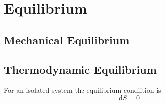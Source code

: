 \documentclass[../thesis.tex]{subfiles}
\begin{document}
    \section{Equilibrium}
    \label{sec:equilibrium}

        \subsection{Mechanical Equilibrium}
        \label{subsec:mech-equilibrium}


        \subsection{Thermodynamic Equilibrium}
        \label{subsec:thermodynamic-equilibrium}

            For an isolated system the equilibrium condiition is
            \begin{equation*}
                \mathrm{d}S = 0
            \end{equation*}
\end{document}

